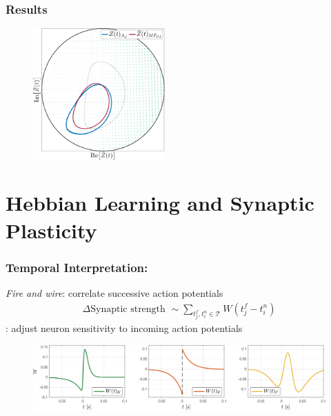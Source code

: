 \begin{frame}
\frametitle{Results} 
\begin{figure}[H]
\centering
\includegraphics[width = 0.45\textwidth]{../Figures/PhaseSpace/ScalefreeLimCycles.pdf}
\label{fig:InspectMeanFieldScaleFreePhaseSpace}
\end{figure}
\end{frame}



\section{\theory Hebbian Learning and Synaptic Plasticity} 
\begin{frame}
\frametitle{Temporal Interpretation: \STDP}
\tabitem \textsl{Fire and wire}: correlate successive action potentials
\begin{align*}
\Delta \text{Synaptic strength  } \sim \sum_{t_{j}^{f}, t_{i}^{n} \in \mathcal{T}} W\left(t_{j}^{f}-t_{i}^{n}\right)
\end{align*}
\tabitem \IP: adjust neuron sensitivity to incoming action potentials
\begin{figure}[H]
\centering
\includegraphics[width = \textwidth]{../Figures/Learning/LearningWindows.pdf}
\label{fig:LearningWindows}
\end{figure}
\end{frame}


